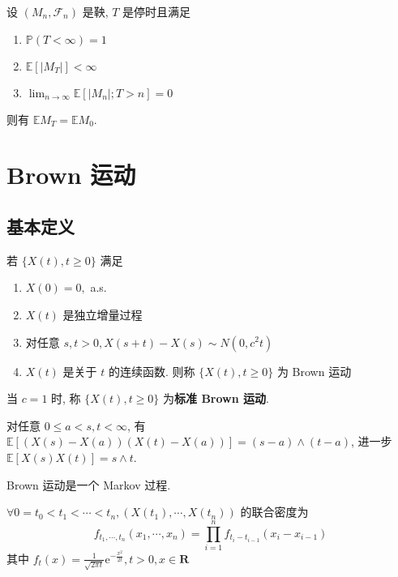 \documentclass[10pt]{yerbaformat}
\begin{document}
\begin{theorem}[停止定理]
    设 $\left(M_{n}, \mathcal{F}_{n}\right)$ 是鞅, $T$ 是停时且满足
    \begin{enumerate}
        \item $\mathbb{P}(T<\infty)=1$
        \item $\mathbb{E}\left[\left|M_{T}\right|\right]<\infty$
        \item $\lim _{n \rightarrow \infty} \mathbb{E}\left[\left|M_{n}\right| ; T>n\right]=0$
    \end{enumerate}
    则有 $\mathbb{E} M_{T}=\mathbb{E} M_{0}$.
\end{theorem}

\section{Brown 运动}
\subsection{基本定义}

\begin{definition}
    若 $\{X(t), t \geq 0\}$ 满足
    \begin{enumerate}
        \item $X(0)=0,$ a.s.
        \item $X(t)$ 是独立增量过程
        \item 对任意 $s, t>0, X(s+t)-X(s) \sim N\left(0, c^{2} t\right)$
        \item $X(t)$ 是关于 $t$ 的连续函数. 则称 $\{X(t), t \geq 0\}$ 为 Brown 运动
    \end{enumerate}
    当 $c=1$ 时, 称 $\{X(t), t \geq 0\}$ 为\textbf{标准 Brown 运动}.
\end{definition}

\begin{theorem}
    对任意 $0 \leq a<s, t<\infty$, 有$\mathbb{E}[(X(s)-X(a))(X(t)-X(a))]=(s-a) \wedge(t-a)$, 进一步 $\mathbb{E}[X(s) X(t)]=s \wedge t$.
\end{theorem}

\begin{theorem}
    Brown 运动是一个 Markov 过程.
\end{theorem}

\begin{theorem}[有限维分布]
    $\forall 0=t_{0}<t_{1}<\cdots<t_{n},\left(X\left(t_{1}\right), \cdots, X\left(t_{n}\right)\right)$ 的联合密度为 $$f_{t_{1}, \cdots, t_{n}}\left(x_{1}, \cdots, x_{n}\right)=\prod_{i=1}^{n} f_{t_{i}-t_{i-1}}\left(x_{i}-x_{i-1}\right)$$ 其中 $f_{t}(x)=\frac{1}{\sqrt{2 \pi t}} \mathrm{e}^{-\frac{x^{2}}{2 t}}, t>0, x \in \mathbf{R}$
\end{theorem}
\end{document}
